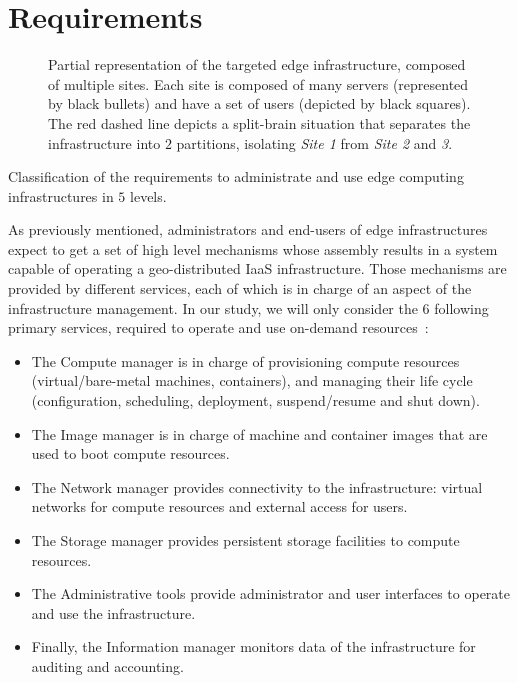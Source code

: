 
\section{Requirements}
\label{sec:requirements}

\begin{figure}[t]
  \centering
  \def\svgwidth{\columnwidth}
  
  \caption{Partial representation of the targeted edge infrastructure, composed
    of multiple sites. Each site is composed of many servers (represented by
    black bullets) and have a set of users (depicted by black squares). The red
    dashed line depicts a split-brain situation that separates the
    infrastructure into $2$ partitions, isolating \emph{Site 1} from \emph{Site
    2} and \emph{3}.}
  \label{fig:sites}
\end{figure}


\begin{table*}
    \centering
        
    \caption{Classification of the requirements to administrate and use edge
    computing infrastructures in $5$ levels.}
    \label{tab:requirements}
\end{table*}


As previously mentioned, administrators and end-users of edge infrastructures
expect to get a set of high level mechanisms whose assembly results in a system
capable of operating a geo-distributed IaaS infrastructure. Those mechanisms
are provided by different services, each of which is in charge of an aspect of
the infrastructure management. In our study, we will only consider the $6$
following primary services, required to operate and use on-demand
resources~\cite{moreno2012csp}:

\begin{itemize}
  \item The Compute manager is in charge of provisioning compute resources
    (\ie virtual/bare-metal machines, containers), and managing their life cycle
    (\eg configuration, scheduling, deployment, suspend/resume and shut down).
  \item The Image manager is in charge of machine and container images that are
    used to boot compute resources.
  \item The Network manager provides connectivity to the infrastructure:
    virtual networks for compute resources and external access for users.
  \item The Storage manager provides persistent storage facilities to
    compute resources.
  \item The Administrative tools provide administrator and user interfaces to
    operate and use the infrastructure.
  \item Finally, the Information manager monitors data of the infrastructure for
    auditing and accounting.
\end{itemize}

